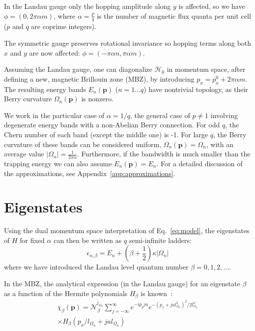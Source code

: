 \documentclass[twocolumn, 10pt, aps, superscriptaddress, floatfix, showpacs, pra, citeautoscript]{revtex4-1}
\newcommand{\vt}[1]{\mathbf{#1}}
\begin{document}
In the Landau gauge only the hopping amplitude along $y$ is affected,
so we have $\phi = (0, 2\pi\alpha m)$, where $\alpha = \frac{p}{q}$ is
the number of magnetic flux quanta per unit cell ($p$ and $q$ are
coprime integers).

The symmetric gauge preserves rotational invariance so hopping terms
along both $x$ and $y$ are now affected: $\phi = (-\pi\alpha n,  \pi\alpha m)$.

Assuming the Landau gauge, one can diagonalize $\mathcal{H}_0$ in
momentum space, after defining a new, magnetic Brillouin zone (MBZ),
by introducing $p_x = p_x^0 + 2\pi \alpha m$. The resulting energy
bands $E_n(\vt{p})$ ($n = 1 \dots q$) have nontrivial topology, as
their Berry curvature $\Omega_n(\vt{p})$ is nonzero.

We work in the particular case of $\alpha=1/q$, the general case of
$p \neq 1$ involving degenerate energy bands with a non-Abelian Berry
connection.  For odd $q$, the Chern number of each band (except the
middle one) is -1. For large $q$, the Berry curvature of these bands
can be considered uniform, $\Omega_n(\vt{p}) = \Omega_n$, with an
average value $|\Omega_n| = \frac{1}{2\pi\alpha}$. Furthermore, if the
bandwidth is much smaller than the trapping energy we can also assume
$E_n(\vt{p}) = E_n$. For a detailed discussion of the approximations,
see Appendix~\ref{app:approximations}.

\section{Eigenstates}\label{sec:eigenstates}
Using the dual momentum space interpretation of Eq.~\eqref{eq:model},
the eigenstates of $H$ for fixed $\alpha$ can then be written
as $q$ semi-infinite ladders:~\cite{price2014magnetic}
%
\begin{equation}\label{eq:ladders}
  \epsilon_{n,\beta} = E_n + \left(\beta + \frac{1}{2}\right) \kappa |\Omega_n|
\end{equation}
where we have introduced the Landau level quantum number
$\beta = 0,1,2,\dots$.

In the MBZ, the analytical expression (in the Landau gauge) for an
eigenstate $\beta$ as a function of the Hermite polynomials $H_\beta$
is known~\cite{price2014magnetic}:
%
\begin{multline}\label{eq:chi}
 \chi_\beta (\vt{p}) = \mathcal{N}_\beta^{l_{\Omega_n}} \sum_{j = -
 \infty}^{\infty} e^{- i p_y j a} e^{ - ( p_x + j a l_{\Omega_n}^2 )
 ^2 / 2 l_{\Omega_n}^2}\\
 \times H_\beta ( p_x / l_{\Omega_n} + j a
 l_{\Omega_n})
\end{multline}
\end{document}
